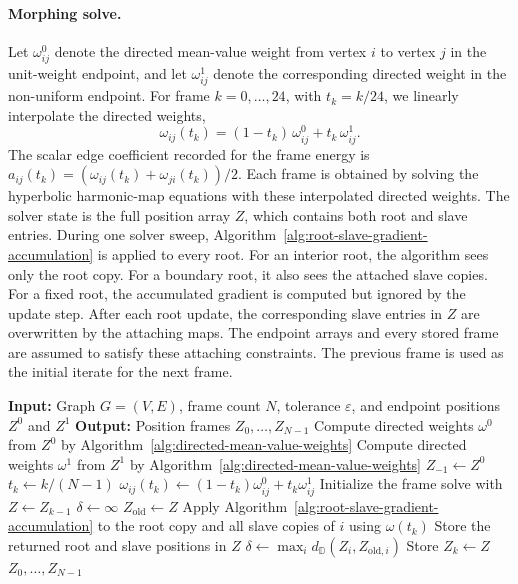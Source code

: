 \documentclass[12pt]{article}
\newcommand{\D}{\mathbb D}
\theoremstyle{definition}
\theoremstyle{remark}
\numberwithin{equation}{section}
\begin{document}
\paragraph{Morphing solve.}
Let $\omega_{ij}^{0}$ denote the directed mean-value weight from vertex $i$ to vertex $j$ in the unit-weight endpoint, and let $\omega_{ij}^{1}$ denote the corresponding directed weight in the non-uniform endpoint. For frame $k=0,\ldots,24$, with $t_k=k/24$, we linearly interpolate the directed weights,
\[
\omega_{ij}(t_k) = (1-t_k)\,\omega_{ij}^{0} + t_k\,\omega_{ij}^{1}.
\]
The scalar edge coefficient recorded for the frame energy is $a_{ij}(t_k)=(\omega_{ij}(t_k)+\omega_{ji}(t_k))/2$. Each frame is obtained by solving the hyperbolic harmonic-map equations with these interpolated directed weights. The solver state is the full position array $Z$, which contains both root and slave entries. During one solver sweep, Algorithm~\ref{alg:root-slave-gradient-accumulation} is applied to every root. For an interior root, the algorithm sees only the root copy. For a boundary root, it also sees the attached slave copies. For a fixed root, the accumulated gradient is computed but ignored by the update step. After each root update, the corresponding slave entries in $Z$ are overwritten by the attaching maps. The endpoint arrays and every stored frame are assumed to satisfy these attaching constraints. The previous frame is used as the initial iterate for the next frame.

\begin{algorithm}[H]
\caption{Mean-value-coordinate morphing}
\label{alg:mean-value-morph}
\begin{algorithmic}[1]
\State \textbf{Input:} Graph $G=(V,E)$, frame count $N$, tolerance $\varepsilon$, and endpoint positions $Z^0$ and $Z^1$
\State \textbf{Output:} Position frames $Z_0,\ldots,Z_{N-1}$
\State Compute directed weights $\omega^0$ from $Z^0$ by Algorithm~\ref{alg:directed-mean-value-weights}
\State Compute directed weights $\omega^1$ from $Z^1$ by Algorithm~\ref{alg:directed-mean-value-weights}
\State $Z_{-1}\gets Z^0$
    \State $t_k\gets k/(N-1)$
        \State $\omega_{ij}(t_k)\gets (1-t_k)\omega_{ij}^0+t_k\omega_{ij}^1$
    \EndFor
    \State Initialize the frame solve with $Z\gets Z_{k-1}$
    \State $\delta\gets\infty$
    \Repeat
        \State $Z_{\mathrm{old}}\gets Z$
            \State Apply Algorithm~\ref{alg:root-slave-gradient-accumulation} to the root copy and all slave copies of $i$ using $\omega(t_k)$
            \State Store the returned root and slave positions in $Z$
        \EndFor
        \State $\delta\gets\max_i d_{\D}(Z_i,Z_{\mathrm{old},i})$
    \Until{$\delta<\varepsilon$}
    \State Store $Z_k\gets Z$
\EndFor
\State \Return $Z_0,\ldots,Z_{N-1}$
\end{algorithmic}
\end{algorithm}
\end{document}
